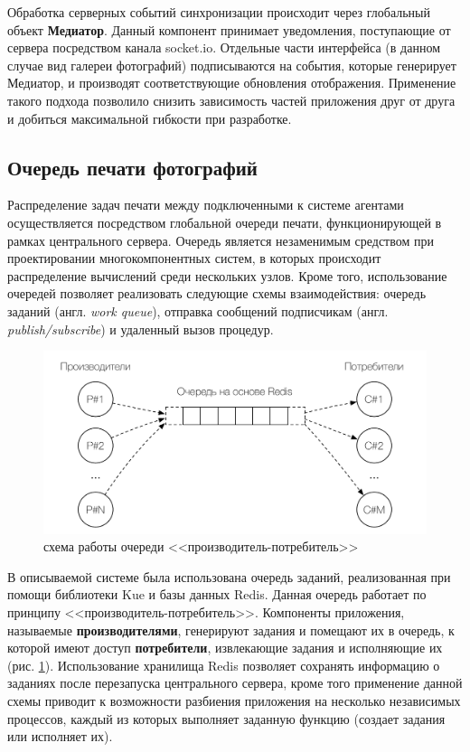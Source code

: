 \documentclass[a4paper,14pt,href,draft]{article}
\begin{document}
Обработка серверных событий синхронизации происходит через глобальный объект \textbf{Медиатор}\cite{MediatorPattern}.
Данный компонент принимает уведомления, поступающие от сервера посредством канала socket.io. Отдельные части интерфейса
(в данном случае вид галереи фотографий) подписываются на события, которые генерирует Медиатор, и производят
соответствующие обновления отображения. Применение такого подхода позволило снизить зависимость частей приложения друг
от друга и добиться максимальной гибкости при разработке.

\subsection{Очередь печати фотографий}
Распределение задач печати между подключенными к системе агентами осуществляется посредством глобальной очереди печати,
функционирующей в рамках центрального сервера. Очередь является незаменимым средством при проектировании многокомпонентных
систем, в которых происходит распределение вычислений среди нескольких узлов. Кроме того, использование очередей позволяет
реализовать следующие схемы взаимодействия: очередь заданий (англ. \textit{work queue}), отправка сообщений
подписчикам\cite{RabbitMQ} (англ. \textit{publish/subscribe}) и удаленный вызов про\-це\-дур\cite{DistributiveSystems}.


\begin{figure}[htbp]
\begin{center}
  \includegraphics[scale=0.8]{producer-consumer.pdf}
    \caption{схема работы очереди <<производитель-потребитель>>}
    \label{fig:ProducerConsumer}
\end{center}
\end{figure}


В описываемой системе была использована очередь заданий, реализованная при помощи библиотеки Kue\cite{Kue} и базы данных
Redis. Данная очередь работает по принципу <<производитель-потребитель>>. Компоненты приложения, называемые
\textbf{производителями}, генерируют задания и помещают их в очередь, к которой имеют доступ \textbf{потребители},
извлекающие задания и исполняющие их (рис. \ref{fig:ProducerConsumer}). Использование хранилища Redis позволяет
сохранять информацию о заданиях после перезапуска центрального сервера, кроме того применение данной схемы приводит к
возможности разбиения приложения на несколько независимых процессов, каждый из которых выполняет заданную функцию
(создает задания или исполняет их).
\end{document}

